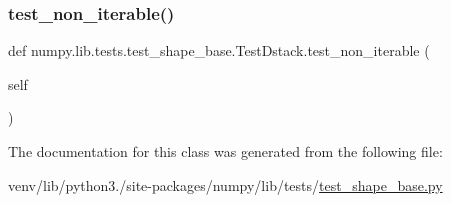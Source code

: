 \subsubsection{\texorpdfstring{test\+\_\+non\+\_\+iterable()}{test\_non\_iterable()}}
{\footnotesize\ttfamily def numpy.\+lib.\+tests.\+test\+\_\+shape\+\_\+base.\+Test\+Dstack.\+test\+\_\+non\+\_\+iterable (\begin{DoxyParamCaption}\item[{}]{self }\end{DoxyParamCaption})}



The documentation for this class was generated from the following file\+:\begin{DoxyCompactItemize}
\item 
venv/lib/python3./site-\/packages/numpy/lib/tests/\hyperlink{lib_2tests_2test__shape__base_8py}{test\+\_\+shape\+\_\+base.\+py}\end{DoxyCompactItemize}
